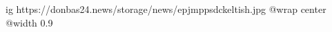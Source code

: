  
 
 
 
 

\ifcmt
  ig https://donbas24.news/storage/news/epjmppsdckeltish.jpg
  @wrap center
  @width 0.9
\fi
